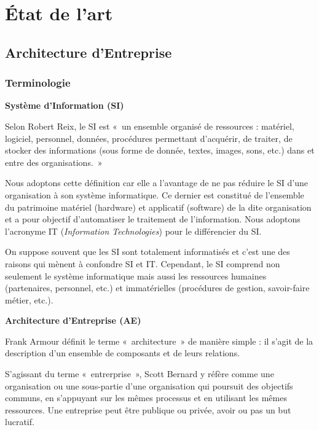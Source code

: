 \chapter{État de l'art}
\label{chap:Etat de l'art}

\section{Architecture d'Entreprise}

\subsection{Terminologie}

\textbf{Système d'Information (SI)}

Selon Robert Reix, le SI est «~un ensemble organisé de ressources : matériel, 
logiciel, personnel, données, procédures permettant d'acquérir, de traiter, de 
stocker des informations (sous forme de donnée, textes, images, sons, etc.) dans 
et entre des organisations.~»

Nous adoptons cette définition car elle a l'avantage de ne pas réduire le SI 
d'une organisation à son système informatique. Ce dernier est constitué de 
l'ensemble du patrimoine matériel (hardware) et applicatif (software) de la dite 
organisation et a pour objectif d'automatiser le traitement de l'information. 
Nous adoptons l'acronyme IT (\textit{Information Technologies}) pour le 
différencier du SI.

On suppose souvent que les SI sont totalement informatisés et c'est une des 
raisons qui mènent à confondre SI et IT. Cependant, le SI comprend non seulement 
le système informatique mais aussi les ressources humaines (partenaires, 
personnel, etc.) et immatérielles (procédures de gestion, savoir-faire métier, 
etc.).



\textbf{Architecture d'Entreprise  (AE)}

Frank Armour définit le terme «~architecture~» de manière simple 
\cite{armour1999bigpicture} : il s'agit de la description d'un ensemble de 
composants et de leurs relations.

S'agissant du terme «~entrerprise~», Scott Bernard 
\cite{bernard2012introduction} y réfère comme une
organisation ou une sous-partie d'une organisation qui poursuit des objectifs 
communs, en s'appuyant sur les mêmes processus et en utilisant les mêmes 
ressources. Une entreprise peut être publique ou privée, avoir ou pas un but 
lucratif. 

